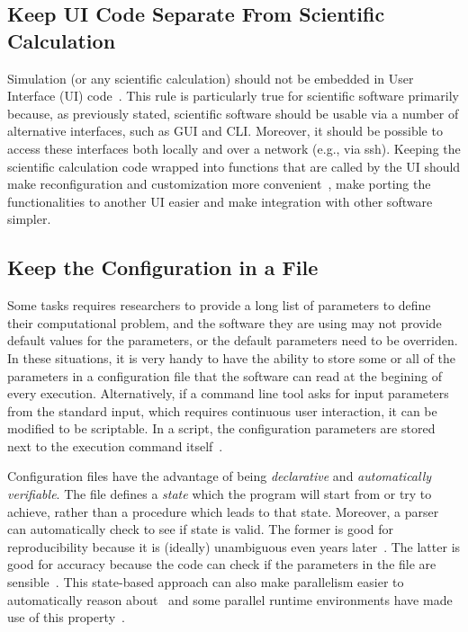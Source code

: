 \documentclass[conference]{IEEEtran}
\begin{document}
\subsection{Keep UI Code Separate From Scientific Calculation}

Simulation (or any scientific calculation) should not be embedded in User Interface (UI) code~\cite{Kelly:2009}.
This rule is particularly true for scientific software primarily because, as previously stated, scientific software should be usable via a number of alternative interfaces, such as GUI and CLI. Moreover, it should be possible to access these interfaces both locally and over a network (e.g., via ssh).
Keeping the scientific calculation code wrapped into functions that are called by the UI should
make reconfiguration and customization more convenient~\cite{Bastos:2013},
make porting the functionalities to another UI easier
and
make integration with other software simpler.


\subsection{Keep the Configuration in a File} \label{sec:beyond:GUIs}

Some tasks requires researchers to provide a long list of parameters to define their computational problem, 
and the software they are using may not provide default values for the parameters, or the default parameters need to be overriden.
In these situations, it
is very handy to have the ability to store some or all of the parameters
in a configuration file that the software can read
at the begining of every execution. 
Alternatively, if a command line tool asks for input parameters from 
the standard input, which requires continuous user interaction, 
it can be modified to be scriptable.
In a script, the configuration parameters are stored next to the 
execution command itself~\cite{Potterton:hv0002}.

Configuration files have the advantage of being \textit{declarative} and
\textit{automatically verifiable}. 
The file defines a \textit{state} which the program will start from or try to achieve, rather than a procedure which leads to that state. Moreover, a parser can automatically check to see if state is valid.
The former is good for reproducibility because it is (ideally) unambiguous even years later~\cite{DBLP:conf/agp/Lloyd94}. 
The latter is good for accuracy because the code can check if the parameters in the file are sensible~\cite{Beg:2016}. 
This state-based approach can also make parallelism easier to automatically reason about~\cite{chakravarty1997massively} and some parallel runtime environments have made use of this property~\cite{Buss:2010:SST:1815695.1815713,Bauer:2012:LEL:2388996.2389086}.
\end{document}
